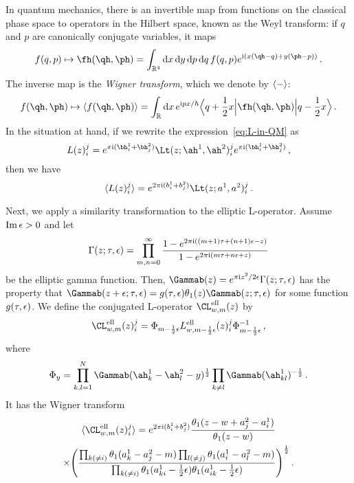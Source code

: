 In quantum mechanics, there is an invertible map from functions on the
classical phase space to operators in the Hilbert space, known as the
Weyl transform: if $q$ and $p$ are canonically conjugate variables, it
maps
\begin{equation}
  f(q,p)
  \mapsto
  \fh(\qh,\ph)
  =
  \int_{\R^4}
  \rmd x \, \rmd y \, \rmd p \, \rmd q \,
  f(q,p)
  e^{\iu(x(\qh - q) + y(\ph - p))} \,.
\end{equation}
The inverse map is the \emph{Wigner transform}, which we denote by
$\langle - \rangle$:
\begin{equation}
  f(\qh,\ph)
  \mapsto
  \vev{f(\qh,\ph)}
  = \int_\R \rmd x \, e^{\iu px/\hbar}
  \Bigbra{q + \frac12 x} \fh(\qh,\ph) \Bigket{q - \frac12 x} \,.
\end{equation}
In the situation at hand, if we rewrite the
expression~\eqref{eq:L-in-QM} as
\begin{equation}
  L(z)_i^j
  =
  e^{\pi\iu(\bh_i^1 + \bh_j^2)}
  \Lt(z; \ah^1, \ah^2)_i^j
  e^{\pi\iu(\bh_i^1 + \bh_j^2)}
  \,,
\end{equation}
then we have
\begin{equation}
  \vev{L(z)_i^j}
  =
  e^{2\pi\iu(b_i^1 + b_j^2)} \Lt(z; a^1, a^2)_i^j \,.
\end{equation}

Next, we apply a similarity transformation to the elliptic L-operator.
Assume $\mathop{\mathrm{Im}}\nolimits\epsilon > 0$ and let
\begin{equation}
  \Gamma(z;\tau,\epsilon)
  =
  \prod_{m,n=0}^\infty
  \frac{1 - e^{2\pi\mathrm{i}((m+1)\tau + (n+1)\epsilon - z)}}
        {1 - e^{2\pi\mathrm{i}(m\tau + n\epsilon + z)}}
\end{equation}
be the elliptic gamma function.  Then,
$\Gammab(z) = e^{\pi\iu z^2/2\eps} \Gamma(z;\tau,\eps)$ has the
property that
$\Gammab(z + \eps; \tau,\eps) = g(\tau,\eps) \theta_1(z) \Gammab(z;\tau,\eps)$
for some function $g(\tau,\epsilon)$.  We define the
conjugated L-operator $\CL^{\text{ell}}_{w,m}(z)$ by
\begin{equation}
  \CL^{\text{ell}}_{w,m}(z)_i^j
  =
  \Phi_{m-\frac12\eps}
  L^{\text{ell}}_{w,m - \frac12\eps}(z)_i^j
  \Phi_{m-\frac12\eps}^{-1} \,,
\end{equation}
where
\begin{equation}
  \Phi_y
  =
  \prod_{k,l=1}^N \Gammab(\ah^1_k - \ah^2_l - y)^{\frac12}
  \prod_{k \neq l} \Gammab(\ah^1_{kl})^{-\frac12} \,.
\end{equation}
It has the Wigner transform
\begin{multline}
  \vev{\CL^{\text{ell}}_{w,m}(z)_i^j}
  =
  e^{2\pi\iu(b_i^1 + b_j^2)}
  \frac{\theta_1(z - w + a^2_j - a^1_i)}{\theta_1(z - w)}
  \\
  \times
  \Biggl(
  \frac{\prod_{k (\neq i)} \theta_1(a^1_k - a^2_j - m)
        \prod_{l (\neq j)} \theta_1(a^1_i - a^2_l - m)}
        {\prod_{k (\neq i)}\theta_1(a^1_{ki} - \frac12\eps)
        \theta_1(a^1_{ik} - \frac12\eps)}
  \Biggr)^{\frac12}
  \,.
\end{multline}

